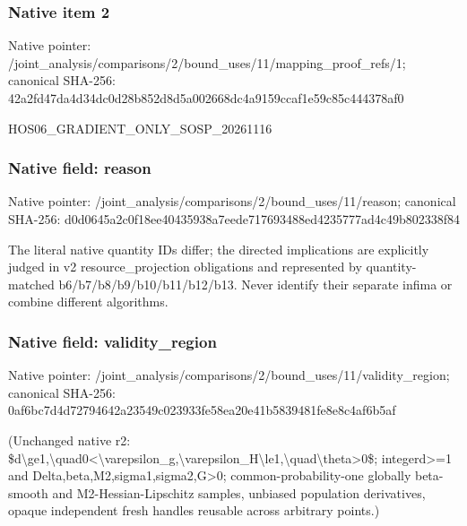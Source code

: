 \documentclass[10pt,a4paper]{article}
\begin{document}
\subsubsection{Native item 2}
Native pointer: /joint\_\allowbreak{}analysis/comparisons/2/bound\_\allowbreak{}uses/11/mapping\_\allowbreak{}proof\_\allowbreak{}refs/1; canonical SHA-256: 42a2fd47da4d34dc0d28b852d8d5a002668dc4a9159ccaf1e59c85c444378af0

\begingroup\raggedright\sloppy HOS06\_\allowbreak{}GRADIENT\_\allowbreak{}ONLY\_\allowbreak{}SOSP\_\allowbreak{}20261116\par\endgroup

\subsubsection{Native field: reason}
Native pointer: /joint\_\allowbreak{}analysis/comparisons/2/bound\_\allowbreak{}uses/11/reason; canonical SHA-256: d0d0645a2c0f18ee40435938a7eede717693488ed4235777ad4c49b802338f84

\begingroup\raggedright\sloppy The literal native quantity IDs differ;\allowbreak{} the directed implications are explicitly judged in v2 resource\_\allowbreak{}projection obligations and represented by quantity-matched b6/\allowbreak{}b7/\allowbreak{}b8/\allowbreak{}b9/\allowbreak{}b10/\allowbreak{}b11/\allowbreak{}b12/\allowbreak{}b13. Never identify their separate infima or combine different algorithms.\par\endgroup

\subsubsection{Native field: validity\_\allowbreak{}region}
Native pointer: /joint\_\allowbreak{}analysis/comparisons/2/bound\_\allowbreak{}uses/11/validity\_\allowbreak{}region; canonical SHA-256: 0af6bc7d4d72794642a23549c023933fe58ea20e41b5839481fe8e8c4af6b5af

\begingroup\raggedright\sloppy (Unchanged native r2:\allowbreak{} \$d\textbackslash{}ge1,\allowbreak{}\textbackslash{}quad0<\textbackslash{}varepsilon\_\allowbreak{}g,\allowbreak{}\textbackslash{}varepsilon\_\allowbreak{}H\textbackslash{}le1,\allowbreak{}\textbackslash{}quad\textbackslash{}theta>0\$;\allowbreak{} integerd>=\allowbreak{}1 and Delta,\allowbreak{}beta,\allowbreak{}M2,\allowbreak{}sigma1,\allowbreak{}sigma2,\allowbreak{}G>0;\allowbreak{} common-probability-one globally beta-smooth and M2-Hessian-Lipschitz samples,\allowbreak{} unbiased population derivatives,\allowbreak{} opaque independent fresh handles reusable across arbitrary points.)\par\endgroup
\end{document}
